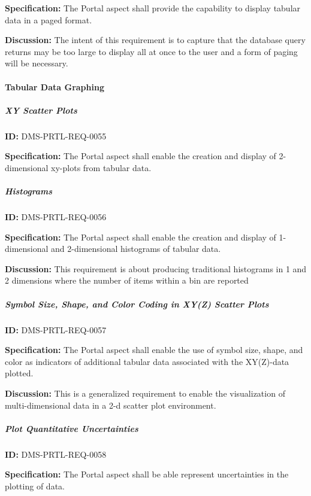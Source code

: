 \documentclass[SE,toc]{lsstdoc}
\begin{document}
\textbf{Specification:}
The Portal aspect shall provide the capability to display tabular data in a paged format.

\textbf{Discussion:}
The intent of this requirement is to capture that the database query returns may be too large to display all at once to the user and a form of paging will be necessary.

\paragraph{Tabular Data Graphing}\hfill  %

\subparagraph{XY Scatter Plots}\hfill  %

\label{DMS-PRTL-REQ-0055}
\textbf{ID:} DMS-PRTL-REQ-0055

\textbf{Specification:}
The Portal aspect shall enable the creation and display of 2-dimensional xy-plots from tabular data.

\subparagraph{Histograms}\hfill  %

\label{DMS-PRTL-REQ-0056}
\textbf{ID:} DMS-PRTL-REQ-0056

\textbf{Specification:}
The Portal aspect shall enable the creation and display of 1-dimensional and 2-dimensional histograms of tabular data.

\textbf{Discussion:}
This requirement is about producing traditional histograms in 1 and 2 dimensions where the number of items within a bin are reported

\subparagraph{Symbol Size, Shape, and Color Coding in XY(Z) Scatter Plots}\hfill  %

\label{DMS-PRTL-REQ-0057}
\textbf{ID:} DMS-PRTL-REQ-0057

\textbf{Specification:}
The Portal aspect shall enable the use of symbol size, shape, and color as indicators of additional tabular data associated with the XY(Z)-data plotted.

\textbf{Discussion:}
This is a generalized requirement to enable the visualization of multi-dimensional data in a 2-d scatter plot environment.

\subparagraph{Plot Quantitative Uncertainties}\hfill  %

\label{DMS-PRTL-REQ-0058}
\textbf{ID:} DMS-PRTL-REQ-0058

\textbf{Specification:}
The Portal aspect shall be able represent uncertainties in the plotting of data.
\end{document}
